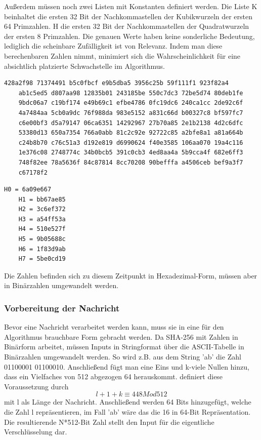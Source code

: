 Außerdem müssen noch zwei Listen mit Konstanten definiert werden. Die Liste K beinhaltet die ersten 32 Bit der Nachkommastellen der Kubikwurzeln der ersten 64 Primzahlen.
H die ersten 32 Bit der Nachkommastellen der Quadratwurzeln der ersten 8 Primzahlen. 
Die genauen Werte haben keine sonderliche Bedeutung, lediglich die scheinbare Zufälligkeit ist von Relevanz. Indem man diese berechenbaren Zahlen nimmt, minimiert sich die Wahrscheinlichkeit für eine absichtlich platzierte Schwachstelle im Algorithmus.
\begin{lstlisting}[caption={Liste K von Konstanten},captionpos=b]
	428a2f98 71374491 b5c0fbcf e9b5dba5 3956c25b 59f111f1 923f82a4 
	ab1c5ed5 d807aa98 12835b01 243185be 550c7dc3 72be5d74 80deb1fe 
	9bdc06a7 c19bf174 e49b69c1 efbe4786 0fc19dc6 240ca1cc 2de92c6f 
	4a7484aa 5cb0a9dc 76f988da 983e5152 a831c66d b00327c8 bf597fc7
	c6e00bf3 d5a79147 06ca6351 14292967 27b70a85 2e1b2138 4d2c6dfc
	53380d13 650a7354 766a0abb 81c2c92e 92722c85 a2bfe8a1 a81a664b 
	c24b8b70 c76c51a3 d192e819 d6990624 f40e3585 106aa070 19a4c116 
	1e376c08 2748774c 34b0bcb5 391c0cb3 4ed8aa4a 5b9cca4f 682e6ff3 
	748f82ee 78a5636f 84c87814 8cc70208 90befffa a4506ceb bef9a3f7 
	c67178f2
\end{lstlisting}
\begin{lstlisting}[caption={Liste H mit den Arbeitsvariablen H0 - H7},captionpos=b]
	H0 = 6a09e667
	H1 = bb67ae85
	H2 = 3c6ef372
	H3 = a54ff53a
	H4 = 510e527f
	H5 = 9b05688c
	H6 = 1f83d9ab
	H7 = 5be0cd19
\end{lstlisting}
Die Zahlen befinden sich zu diesem Zeitpunkt in Hexadezimal-Form, müssen aber in Binärzahlen umgewandelt werden.
\subsubsection{Vorbereitung der Nachricht}
Bevor eine Nachricht verarbeitet werden kann, muss sie in eine für den Algorithmus brauchbare Form gebracht werden. 
Da SHA-256 mit Zahlen in Binärform arbeitet, müssen Inputs in Stringformat über die ASCII-Tabelle in Binärzahlen umgewandelt werden. So wird z.B. aus dem String 'ab' die Zahl 01100001 01100010.
Anschließend fügt man eine Eins und k-viele Nullen hinzu, dass ein Vielfaches von 512 abgezogen 64 herauskommt. \cite{dang_2015} definiert diese Voraussetzung durch
$$l+1+k \equiv 448 Mod512$$
mit l als Länge der Nachricht. Anschließend werden 64 Bits hinzugefügt, welche die Zahl l repräsentieren, im Fall 'ab' wäre das die 16 in 64-Bit Repräsentation. Die resultierende N*512-Bit Zahl stellt den Input für die eigentliche Verschlüsselung dar.

